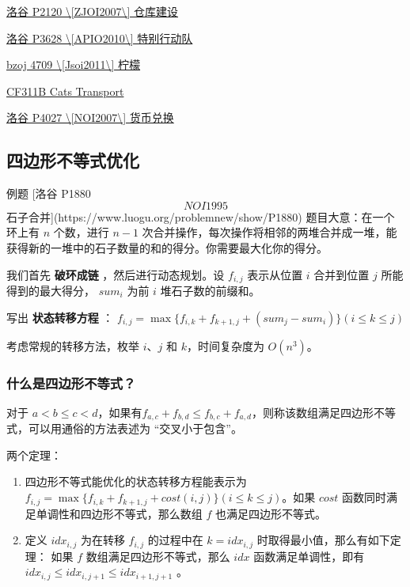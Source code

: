 \href{https://www.luogu.org/problemnew/show/P2120}{洛谷 P2120 \textbackslash{}[ZJOI2007\textbackslash{}] 仓库建设}

\href{https://www.luogu.org/problemnew/show/P3628}{洛谷 P3628 \textbackslash{}[APIO2010\textbackslash{}] 特别行动队}

\href{https://www.lydsy.com/JudgeOnline/problem.php?id=4709}{bzoj 4709 \textbackslash{}[Jsoi2011\textbackslash{}] 柠檬}

\href{http://codeforces.com/problemset/problem/311/B}{CF311B Cats Transport}

\href{https://www.luogu.org/problemnew/show/P4027}{洛谷 P4027 \textbackslash{}[NOI2007\textbackslash{}] 货币兑换}

\subsection{四边形不等式优化}

\begin{NOTE}{ 例题 [洛谷 P1880 \[NOI1995\] 石子合并](https://www.luogu.org/problemnew/show/P1880)}{}
题目大意：在一个环上有 $n$ 个数，进行 $n-1$ 次合并操作，每次操作将相邻的两堆合并成一堆，能获得新的一堆中的石子数量的和的得分。你需要最大化你的得分。
\end{NOTE}


我们首先 \textbf{ 破环成链 } ，然后进行动态规划。设 $f_{i,j}$ 表示从位置 $i$ 合并到位置 $j$ 所能得到的最大得分， $sum_i$ 为前 $i$ 堆石子数的前缀和。

写出 \textbf{ 状态转移方程 } ： $f_{i,j}=\max\{f_{i,k}+f_{k+1,j}+(sum_j-sum_i)\}(i\le k\le j)$

考虑常规的转移方法，枚举 $i$、$j$ 和 $k$，时间复杂度为 $O(n^3)$。

\subsubsection{什么是四边形不等式？}

对于 $a<b\le c<d$，如果有$f_{a,c}+f_{b,d}\le f_{b,c}+f_{a,d}$，则称该数组满足四边形不等式，可以用通俗的方法表述为 “交叉小于包含”。

两个定理：

\begin{enumerate}
\item 四边形不等式能优化的状态转移方程能表示为 $f_{i,j}=\max\{f_{i,k}+f_{k+1,j}+cost(i,j)\}(i\le k\le j)$。如果 $cost$ 函数同时满足单调性和四边形不等式，那么数组 $f$ 也满足四边形不等式。
\item 定义 $idx_{i,j}$ 为在转移 $f_{i,j}$ 的过程中在 $k=idx_{i,j}$ 时取得最小值，那么有如下定理：
如果 $f$ 数组满足四边形不等式，那么 $idx$ 函数满足单调性，即有 $idx_{i,j}\le idx_{i,j+1}\le idx_{i+1,j+1}$ 。
\end{enumerate}

